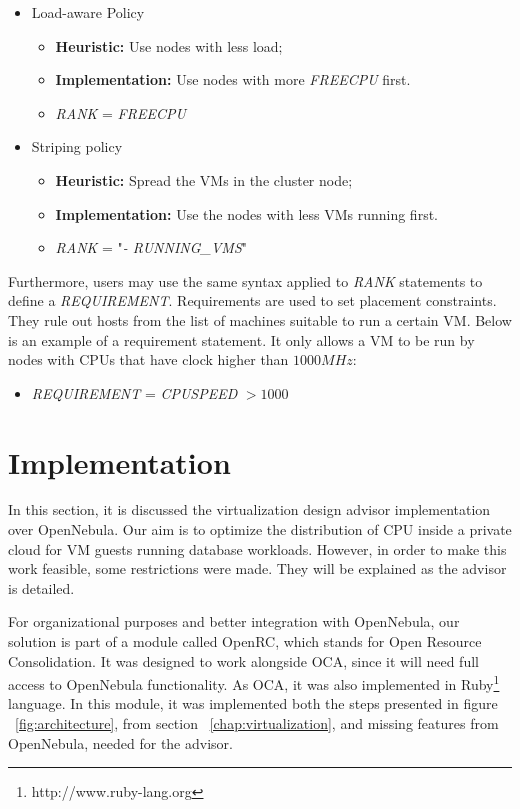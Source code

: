 \documentclass[jidm,a4paper]{jidm} %
\begin{document}
\begin{itemize}
 \item Load-aware Policy
 \begin{itemize}
   \item \textbf{Heuristic:} Use nodes with less load;
   \item \textbf{Implementation:} Use nodes with more \textit{FREECPU} first.
    \item \textit{RANK} = \textit{FREECPU}

 \end{itemize}

  \item Striping policy
  \begin{itemize}
   \item \textbf{Heuristic:} Spread the VMs in the cluster node;
   \item \textbf{Implementation:} Use the nodes with less VMs running first.
   \item \textit{RANK} = "\textit{- RUNNING\_VMS}"
  \end{itemize}

\end{itemize}

Furthermore, users may use the same syntax applied to \textit{RANK} statements to define a \textit{REQUIREMENT}. Requirements are used to set placement constraints. They rule out hosts from the list of machines suitable to run a certain VM. Below is an example of a requirement statement. It only allows  a VM to be run by nodes with CPUs that have clock higher than $1000 MHz$:
\begin{itemize}
 \item \textit{REQUIREMENT} = \textit{CPUSPEED} $> 1000$ 
\end{itemize}



\section{Implementation}

\label{chap:implementation}

In this section, it is discussed the virtualization design advisor implementation over OpenNebula. Our aim is to optimize the distribution of CPU inside a private cloud for VM guests running database workloads. However, in order to make this work feasible, some restrictions were made. They will be explained as the advisor is detailed.

For organizational purposes and better integration with OpenNebula, our solution  is part of a module called OpenRC, which stands for Open Resource Consolidation. It was designed to work alongside OCA, since it will need full access to OpenNebula functionality. As OCA, it was also implemented in Ruby\footnote{http://www.ruby-lang.org} language. In this module, it was implemented both the steps presented in figure ~\ref{fig:architecture}, from section ~\ref{chap:virtualization}, and missing features from OpenNebula, needed for the advisor.
\end{document}
